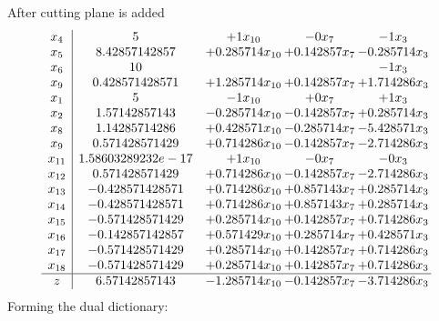 \documentclass[11pt]{article}
\begin{document}
 After cutting plane is added 
\[\begin{array}{c| c c@{\hskip 2pt} c@{\hskip 2pt} c@{\hskip 2pt} }
 x_{4}   &  5 & + 1 x_{10} & -0 x_{7} & -1 x_{3}\\
 x_{5}   &  8.42857142857 & + 0.285714 x_{10} & + 0.142857 x_{7} & -0.285714 x_{3}\\
 x_{6}   &  10  &    &   & -1 x_{3}\\
 x_{9}   &  0.428571428571 & + 1.285714 x_{10} & + 0.142857 x_{7} & + 1.714286 x_{3}\\
 x_{1}   &  5 & -1 x_{10} & + 0 x_{7} & + 1 x_{3}\\
 x_{2}   &  1.57142857143 & -0.285714 x_{10} & -0.142857 x_{7} & + 0.285714 x_{3}\\
 x_{8}   &  1.14285714286 & + 0.428571 x_{10} & -0.285714 x_{7} & -5.428571 x_{3}\\
 x_{9}   &  0.571428571429 & + 0.714286 x_{10} & -0.142857 x_{7} & -2.714286 x_{3}\\
 x_{11}   &  1.58603289232e-17 & + 1 x_{10} & -0 x_{7} & -0 x_{3}\\
 x_{12}   &  0.571428571429 & + 0.714286 x_{10} & -0.142857 x_{7} & -2.714286 x_{3}\\
 x_{13}   &  -0.428571428571 & + 0.714286 x_{10} & + 0.857143 x_{7} & + 0.285714 x_{3}\\
 x_{14}   &  -0.428571428571 & + 0.714286 x_{10} & + 0.857143 x_{7} & + 0.285714 x_{3}\\
 x_{15}   &  -0.571428571429 & + 0.285714 x_{10} & + 0.142857 x_{7} & + 0.714286 x_{3}\\
 x_{16}   &  -0.142857142857 & + 0.571429 x_{10} & + 0.285714 x_{7} & + 0.428571 x_{3}\\
 x_{17}   &  -0.571428571429 & + 0.285714 x_{10} & + 0.142857 x_{7} & + 0.714286 x_{3}\\
 x_{18}   &  -0.571428571429 & + 0.285714 x_{10} & + 0.142857 x_{7} & + 0.714286 x_{3}\\
\hline
z    &  6.57142857143 & -1.285714 x_{10} & -0.142857 x_{7} & -3.714286 x_{3}\\
\end{array}\]
Forming the dual dictionary:
\end{document}
